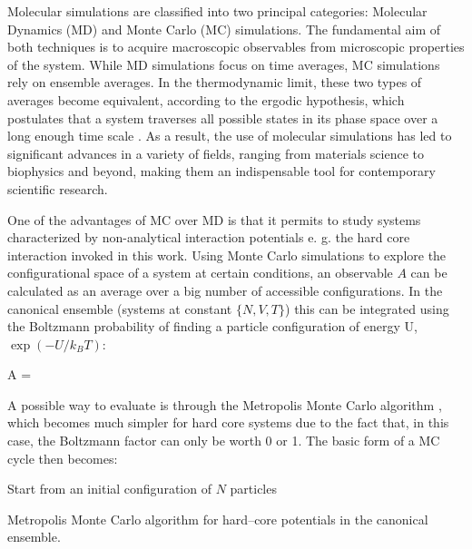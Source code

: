 Molecular simulations are classified into two principal categories: Molecular Dynamics (MD) and Monte Carlo (MC) simulations. The fundamental aim of both techniques is to acquire macroscopic observables from microscopic properties of the system. While MD simulations focus on time averages, MC simulations rely on ensemble averages. In the thermodynamic limit, these two types of averages become equivalent, according to the ergodic hypothesis, which postulates that a system traverses all possible states in its phase space over a long enough time scale \cite{dfrenkel96:mc}. As a result, the use of molecular simulations has led to significant advances in a variety of fields, ranging from materials science to biophysics and beyond, making them an indispensable tool for contemporary scientific research.

One of the advantages of MC over MD is that it permits to study systems characterized by non-analytical interaction potentials e. g. the hard core interaction invoked in this work. Using Monte Carlo simulations to explore the configurational space of a system at certain conditions, an observable $A$ can be calculated as an average over a big number of accessible configurations. In the canonical ensemble (systems at constant $\{N,V,T\}$) this can be integrated using the Boltzmann probability of finding a particle configuration of energy U, $\exp( -U/k_{B}T)$:

\beq
\langle  A \rangle = 
\label{observable}
\eeq

A possible way to evaluate  is through the Metropolis Monte Carlo algorithm \cite{Metropolis1953}, which becomes much simpler for hard core systems due to the fact that, in this case, the Boltzmann factor can only be worth 0 or 1. The basic form of a MC cycle then becomes:


\begin{algorithm}[h]
    \SetAlgoLined

    Start from an initial configuration of $N$ particles\;
    \caption{Metropolis Monte Carlo algorithm for hard--core potentials in the canonical ensemble.}
    \label{algo:MHPMC}
\end{algorithm}


